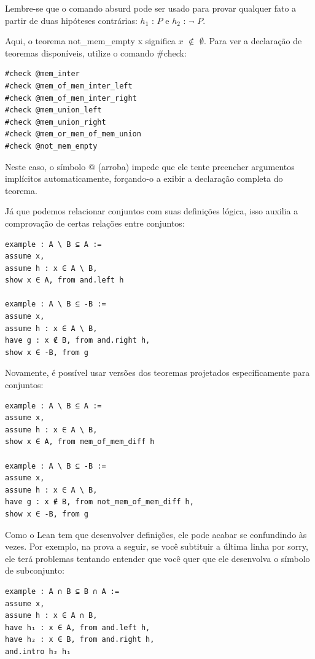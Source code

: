 Lembre-se que o comando{
\selectfont absurd} pode ser usado para provar qualquer fato a partir de duas hipóteses contrárias: $h_1$ : $P$ e $h_2$ : $\neg$ $P$.

Aqui, o teorema {
\selectfont not\_mem\_empty x} significa $x$ $\notin$ $\emptyset$. Para ver a declaração de teoremas disponíveis, utilize o comando{
\selectfont \#check}:
\begin{lstlisting}
#check @mem_inter
#check @mem_of_mem_inter_left
#check @mem_of_mem_inter_right
#check @mem_union_left
#check @mem_union_right
#check @mem_or_mem_of_mem_union
#check @not_mem_empty \end{lstlisting}

Neste caso, o símbolo{
\selectfont @} (arroba) impede que ele tente preencher argumentos implícitos automaticamente, forçando-o a exibir a declaração completa do teorema.

Já que podemos relacionar conjuntos com suas definições lógica, isso auxilia a comprovação de certas relações entre conjuntos:

\begin{lstlisting}
example : A \ B ⊆ A :=
assume x,
assume h : x ∈ A \ B,
show x ∈ A, from and.left h

example : A \ B ⊆ -B :=
assume x,
assume h : x ∈ A \ B,
have g : x ∉ B, from and.right h,
show x ∈ -B, from g \end{lstlisting}

Novamente, é possível usar versões dos teoremas projetados especificamente para conjuntos:

\begin{lstlisting}
example : A \ B ⊆ A :=
assume x,
assume h : x ∈ A \ B,
show x ∈ A, from mem_of_mem_diff h

example : A \ B ⊆ -B :=
assume x,
assume h : x ∈ A \ B,
have g : x ∉ B, from not_mem_of_mem_diff h,
show x ∈ -B, from g \end{lstlisting}

Como o Lean tem que desenvolver definições, ele pode acabar se confundindo às vezes. Por exemplo, na prova a seguir, se você subtituir a última linha por {\selectfont sorry}, ele terá problemas tentando entender que você quer que ele desenvolva o símbolo de subconjunto:

\begin{lstlisting}
example : A ∩ B ⊆ B ∩ A :=
assume x,
assume h : x ∈ A ∩ B,
have h₁ : x ∈ A, from and.left h,
have h₂ : x ∈ B, from and.right h,
and.intro h₂ h₁ \end{lstlisting}

